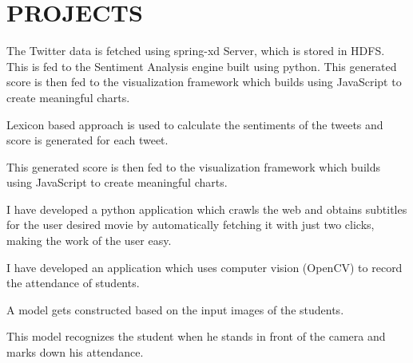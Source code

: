 \documentclass[]{deedy-resume-openfont}
\begin{document}
\begin{minipage}[t]{0.66\textwidth} 


\section{PROJECTS}
\sectionsep
\sectionsep
{}

\vspace{\topsep} %
\begin{tightemize}
\sectionsep
\item The Twitter data is fetched using spring-xd Server, which is stored in HDFS. 
This is fed to the Sentiment Analysis engine built using python.  This generated score is then fed to the visualization framework which builds using JavaScript to create meaningful charts.
\item  Lexicon based approach is used to calculate the sentiments of the tweets and score is generated for each tweet.
\item  This generated score is then fed to the visualization framework which builds using JavaScript to create meaningful charts.
\end{tightemize}
\sectionsep

\sectionsep
\begin{tightemize}
\item  I have developed a python application which crawls the web and obtains subtitles for the user desired movie by automatically fetching it with just two clicks, making the work of the user easy.


\end{tightemize}
\sectionsep

\sectionsep
\begin{tightemize}
\item I have developed an application which uses computer vision (OpenCV) to record the attendance of students.
\item A model gets constructed based on the input images of the students. 
\item This model recognizes the student when he stands in front of the camera and marks down his attendance.
\end{tightemize}
\sectionsep
\sectionsep


\end{minipage}
\end{document}

